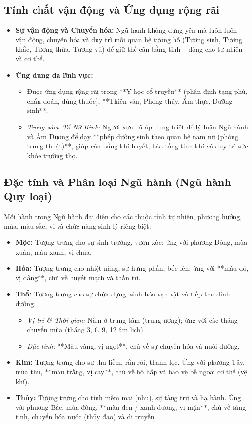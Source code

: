 \subsection{Tính chất vận động và Ứng dụng rộng rãi}
\begin{itemize}
    \item \textbf{Sự vận động và Chuyển hóa:} Ngũ hành không đứng yên mà luôn luôn vận động, chuyển hóa và duy trì mối quan hệ tương hỗ (Tương sinh, Tương khắc, Tương thừa, Tương vũ) để giữ thế cân bằng tĩnh -- động cho tự nhiên và cơ thể.
    \item \textbf{Ứng dụng đa lĩnh vực:} 
    \begin{itemize}
        \item Được ứng dụng rộng rãi trong **Y học cổ truyền** (phân định tạng phủ, chẩn đoán, dùng thuốc), **Thiên văn, Phong thủy, Ẩm thực, Dưỡng sinh**.
        \item \textit{Trong sách Tố Nữ Kinh:} Người xưa đã áp dụng triệt để lý luận Ngũ hành và Âm Dương để dạy **phép dưỡng sinh theo quan hệ nam nữ (phòng trung thuật)**, giúp cân bằng khí huyết, bảo tống tinh khí và duy trì sức khỏe trường thọ.
    \end{itemize}
\end{itemize}


\subsection{Đặc tính và Phân loại Ngũ hành (Ngũ hành Quy loại)}

Mỗi hành trong Ngũ hành đại diện cho các thuộc tính tự nhiên, phương hướng, mùa, màu sắc, vị và chức năng sinh lý riêng biệt:

\begin{itemize}
    \item \textbf{Mộc:} Tượng trưng cho sự sinh trưởng, vươn xòe; ứng với phương Đông, mùa xuân, màu xanh, vị chua.
    \item \textbf{Hỏa:} Tượng trưng cho nhiệt năng, sự hưng phấn, bốc lên; ứng với **màu đỏ, vị đắng**, chủ về huyết mạch và thần trí.
    \item \textbf{Thổ:} Tượng trưng cho sự chứa đựng, sinh hóa vạn vật và tiếp thu dinh dưỡng.
    \begin{itemize}
        \item \textit{Vị trí \& Thời gian:} Nằm ở trung tâm (trung ương); ứng với các tháng chuyển mùa (tháng 3, 6, 9, 12 âm lịch).
        \item \textit{Đặc tính:} **Màu vàng, vị ngọt**, chủ về sự chuyển hóa và nuôi dưỡng.
    \end{itemize}
    \item \textbf{Kim:} Tượng trưng cho sự thu liễm, rắn rỏi, thanh lọc. Ứng với phương Tây, mùa thu, **màu trắng, vị cay**, chủ về hô hấp và bảo vệ bề ngoài cơ thể (vệ khí).
    \item \textbf{Thủy:} Tượng trưng cho tính mềm mại (nhu), sự tàng trữ và hạ hành. Ứng với phương Bắc, mùa đông, **màu đen / xanh dương, vị mặn**, chủ về tàng tinh, chuyển hóa nước (thủy đạo) và di truyền.
\end{itemize}

